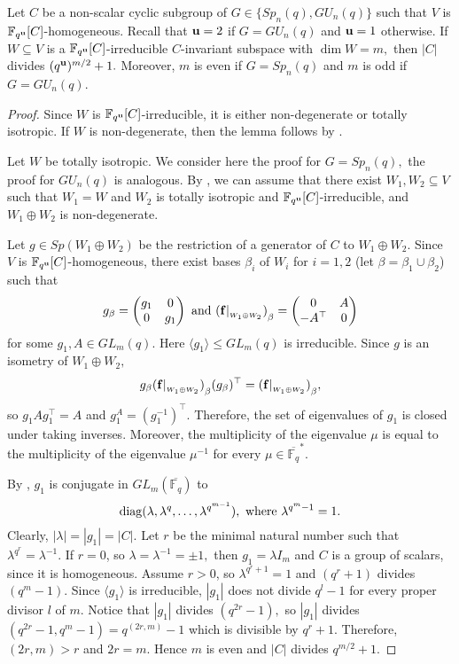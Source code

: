 \begin{Lem}\label{simpcycl}
Let $C$ be a non-scalar cyclic subgroup of $G \in \{Sp_{n}(q), GU_n(q)\}$ such that $V$ is $\mathbb{F}_{q^{\bf u}}[C]$-homogeneous. Recall that ${\bf u}=2$ if $G=GU_n(q)$ and ${\bf u}=1$ otherwise.  If $W \subseteq V$ is a $\mathbb{F}_{q^{\bf u}}[C]$-irreducible $C$-invariant subspace with $\dim W = m,$ then  $|C|$ divides $(q^{\bf u})^{m/2}+1.$ Moreover, $m$ is even if $G=Sp_{n}(q)$ and $m$ is odd if  $G=GU_n(q)$.
\end{Lem}
\begin{proof}
Since $W$ is $\mathbb{F}_{q^{\bf u}}[C]$-irreducible, it is either non-degenerate or totally isotropic. If $W$ is non-degenerate, then the lemma follows by \cite[Satz 4 and 5]{zing}. 

Let $W$ be totally isotropic. We consider here the proof for $G=Sp_{n}(q),$ the proof for $GU_n(q)$ is  analogous. By \cite[(5.2)]{asch}, we can assume that there exist $W_1, W_2 \subseteq V$ such that $W_1=W$ and $W_2$ is totally isotropic and $\mathbb{F}_{q^{\bf u}}[C]$-irreducible, and $W_1 \oplus W_2$ is non-degenerate. 

Let $g \in Sp(W_1 \oplus W_2)$ be the restriction of a generator of $C$ to $W_1 \oplus W_2.$ Since $V$ is $\mathbb{F}_{q^{\bf u}}[C]$-homogeneous, there exist bases $\beta_i$ of $W_i$ for $i=1,2$ (let $\beta=\beta_1 \cup \beta_2$) such that 
$$g_{\beta}=
\begin{pmatrix}
g_1 & 0\\
0 & g_1
\end{pmatrix} 
\text{ and } 
{({\bf f}|_{_{W_1 \oplus W_2}})}_{\beta}=
\begin{pmatrix}
0 & A \\
-A^{\top} & 0
\end{pmatrix}
$$   for some $g_1, A \in GL_m(q).$ Here $\langle g_1 \rangle \le GL_m(q)$ is irreducible. Since $g$ is an isometry of $W_1 \oplus W_2,$ $$g_{\beta}{({\bf f}|_{_{W_1 \oplus W_2}})}_{\beta}(g_{\beta})^{\top}={({\bf f}|_{_{W_1 \oplus W_2}})}_{\beta},$$ so $g_1 A g_1^{\top}=A$ and $g_1^A=(g_1^{-1})^{\top}.$ Therefore, the set of eigenvalues of $g_1$ is closed under taking inverses. Moreover, the multiplicity of the eigenvalue $\mu$ is equal to the multiplicity of the eigenvalue $\mu^{-1}$ for every $\mu \in \overline{\mathbb{F}_q}^*.$

By \cite[Lemma 1.3]{buturl}, $g_1$ is conjugate in $GL_m(\overline{\mathbb{F}_q})$ to 
$$\mathrm{diag}(\lambda,\lambda^q, \ldots, \lambda^{q^{m-1}}), \text{ where } \lambda^{q^m-1}=1.$$
Clearly, $|\lambda| = |g_1|=|C|.$ Let $r$ be the minimal natural number such that $\lambda^{q^r}=\lambda^{-1}.$ If $r=0$, so $\lambda=\lambda^{-1}=\pm 1,$ then $g_1= \lambda I_m$ and $C$ is a group of scalars, since it is homogeneous. Assume $r>0$, so $\lambda^{q^r+1}=1$ and $(q^r+1)$ divides $(q^m-1).$  
Since $\langle g_1 \rangle$ is irreducible, $|g_1|$ does not divide $q^l-1$ for every proper divisor $l$ of $m.$ Notice that $|g_1|$ divides $(q^{2r}-1),$ so $|g_1|$ divides $(q^{2r}-1, q^m-1)=q^{(2r,m)}-1$ which is  divisible by $q^r+1.$ Therefore, $(2r,m)>r$ and $2r=m.$ Hence $m$ is even and $|C|$ divides $q^{m/2}+1.$
\end{proof}

